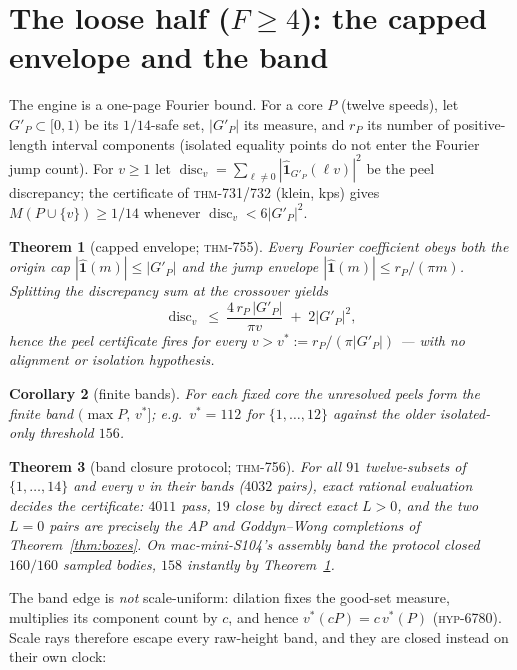 \documentclass[11pt]{article}
\newtheorem{theorem}{Theorem}[section]
\newtheorem{corollary}[theorem]{Corollary}
\theoremstyle{definition}
\begin{document}
\section{The loose half ($F\ge 4$): the capped envelope and the band}\label{sec:loose}

The engine is a one-page Fourier bound. For a core $P$ (twelve speeds), let
$G'_P\subset[0,1)$ be its $1/14$-safe set, $|G'_P|$ its measure, and $r_P$ its number of
positive-length interval components (isolated equality points do not enter the
Fourier jump count). For $v\ge 1$ let
$\operatorname{disc}_v=\sum_{\ell\neq0}|\widehat{\mathbf 1}_{G'_P}(\ell v)|^2$ be the peel
discrepancy; the certificate of \textsc{thm}-731/732 (klein, kps) gives
$M(P\cup\{v\})\ge 1/14$ whenever $\operatorname{disc}_v<6|G'_P|^2$.

\begin{theorem}[capped envelope; \textsc{thm}-755]\label{thm:capped}
Every Fourier coefficient obeys both the origin cap $|\widehat{\mathbf 1}(m)|\le|G'_P|$ and
the jump envelope $|\widehat{\mathbf 1}(m)|\le r_P/(\pi m)$. Splitting the discrepancy sum at
the crossover yields
\[
\operatorname{disc}_v\ \le\ \frac{4\,r_P\,|G'_P|}{\pi v}\; +\; 2|G'_P|^2 ,
\]
hence the peel certificate fires for every
$v> v^\ast := r_P/(\pi|G'_P|)$ --- with no alignment or isolation hypothesis.
\end{theorem}

\begin{corollary}[finite bands]
For each fixed core the unresolved peels form the finite band $(\max P,\,v^\ast]$;
e.g.\ $v^\ast=112$ for $\{1,\dots,12\}$ against the older isolated-only
threshold $156$.
\end{corollary}

\begin{theorem}[band closure protocol; \textsc{thm}-756]\label{thm:band}
For all $91$ twelve-subsets of $\{1,\dots,14\}$ and every $v$ in their bands ($4032$ pairs),
exact rational evaluation decides the certificate: $4011$ pass, $19$ close by direct exact
$L>0$, and the two $L=0$ pairs are precisely the AP and Goddyn--Wong completions of
Theorem~\ref{thm:boxes}. On mac-mini-S104's assembly band the protocol closed $160/160$
sampled bodies, $158$ instantly by Theorem~\ref{thm:capped}.
\end{theorem}

The band edge is \emph{not} scale-uniform: dilation fixes the good-set measure, multiplies
its component count by $c$, and hence $v^\ast(cP)=c\,v^\ast(P)$ (\textsc{hyp}-6780). Scale
rays therefore escape every raw-height band, and they are closed instead on their own
clock:
\end{document}
